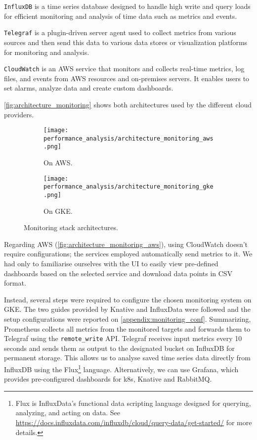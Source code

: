 \documentclass[../thesis.tex]{subfiles}
\begin{document}
\texttt{InfluxDB} is a time series database designed to handle high write and query loads for efficient monitoring and analysis of time data such as metrics and events.

\texttt{Telegraf} is a plugin-driven server agent used to collect metrics from various sources and then send this data to various data stores or visualization platforms for monitoring and analysis.

\texttt{CloudWatch} is an \acrshort{AWS} service that monitors and collects real-time metrics, log files, and events from \acrshort{AWS} resources and on-premises servers. It enables users to set alarms, analyze data and create custom dashboards.

\autoref{fig:architecture_monitoring} shows both architectures used by the different cloud providers.

\begin{figure}[H]
\centering
    \begin{subfigure}[b]{.75\textwidth}
        \texttt{[image: performance\_analysis/architecture\_monitoring\_aws.png]}
        \caption[Monitoring stack architecture on \acrshort{AWS}]{On \acrshort{AWS}.}
        \label{fig:architecture_monitoring_aws}
    \end{subfigure}
    \begin{subfigure}[b]{1\textwidth}
        \texttt{[image: performance\_analysis/architecture\_monitoring\_gke.png]}
        \caption[Monitoring stack architecture on \acrshort{GKE}]{On \acrshort{GKE}.}
        \label{fig:architecture_monitoring_gke}
    \end{subfigure}
\caption{Monitoring stack architectures.}
\label{fig:architecture_monitoring}
\end{figure}

Regarding \acrshort{AWS} (\autoref{fig:architecture_monitoring_aws}), using CloudWatch doesn't require configurations; the services employed automatically send metrics to it. We had only to familiarise ourselves with the \acrshort{UI} to easily view pre-defined dashboards based on the selected service and download data points in \acrshort{CSV} format.

Instead, several steps were required to configure the chosen monitoring system on \acrshort{GKE}. The two guides provided by Knative \cite{site:knative_collecting_metrics} and InfluxData \cite{site:prom_tel_influx} were followed and the setup configurations were reported on \autoref{appendix:monitoring_conf}. Summarizing, Prometheus collects all metrics from the monitored targets and forwards them to Telegraf using the \texttt{remote\_write} \acrshort{API}. Telegraf receives input metrics every 10 seconds and sends them as output to the designated bucket on InfluxDB for permanent storage. This allows us to analyse saved time series data directly from InfluxDB using the Flux\footnote{Flux is InfluxData’s functional data scripting language designed for querying, analyzing, and acting on data. See \href{https://docs.influxdata.com/influxdb/cloud/query-data/get-started/}{https://docs.influxdata.com/influxdb/cloud/query-data/get-started/} for more details.} language. Alternatively, we can use Grafana, which provides pre-configured dashboards for \gls{k8s}, Knative and RabbitMQ.
\end{document}
